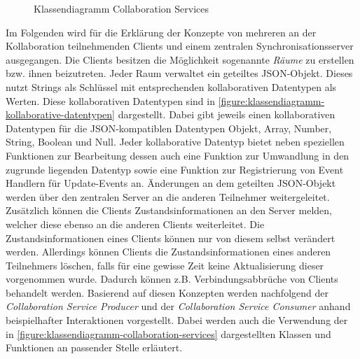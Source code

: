 \begin{figure}[tbp]
    \caption{Klassendiagramm Collaboration Services}
    \label{figure:klassendiagramm-collaboration-services}
\end{figure}

Im Folgenden wird für die Erklärung der Konzepte von mehreren an der Kollaboration teilnehmenden Clients und einem zentralen Synchronisationsserver ausgegangen. Die Clients besitzen die Möglichkeit sogenannte \textit{Räume} zu erstellen bzw. ihnen beizutreten. Jeder Raum verwaltet ein geteiltes JSON-Objekt. Dieses nutzt Strings als Schlüssel mit entsprechenden kollaborativen Datentypen als Werten. Diese kollaborativen Datentypen sind in \autoref{figure:klassendiagramm-kollaborative-datentypen} dargestellt. Dabei gibt jeweils einen kollaborativen Datentypen für die JSON-kompatiblen Datentypen Objekt, Array, Number, String, Boolean und Null. Jeder kollaborative Datentyp bietet neben speziellen Funktionen zur Bearbeitung dessen auch eine Funktion zur Umwandlung in den zugrunde liegenden Datentyp sowie eine Funktion zur Registrierung von Event Handlern für Update-Events an. Änderungen an dem geteilten JSON-Objekt werden über den zentralen Server an die anderen Teilnehmer weitergeleitet. Zusätzlich können die Clients Zustandsinformationen an den Server melden, welcher diese ebenso an die anderen Clients weiterleitet. Die Zustandsinformationen eines Clients können nur von diesem selbst verändert werden. Allerdings können Clients die Zustandsinformationen eines anderen Teilnehmers löschen, falls für eine gewisse Zeit keine Aktualisierung dieser vorgenommen wurde. Dadurch können z.B. Verbindungsabbrüche von Clients behandelt werden. Basierend auf diesen Konzepten werden nachfolgend der \textit{Collaboration Service Producer} und der \textit{Collaboration Service Consumer} anhand beispielhafter Interaktionen vorgestellt. Dabei werden auch die Verwendung der in \autoref{figure:klassendiagramm-collaboration-services} dargestellten Klassen und Funktionen an passender Stelle erläutert.

